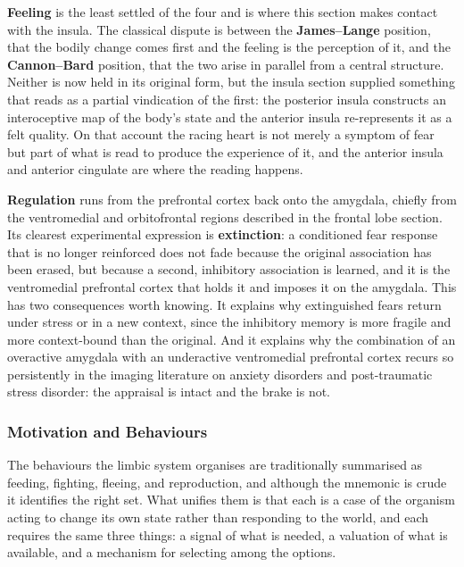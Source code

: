 \documentclass[11pt]{article}
\begin{document}
\textbf{Feeling} is the least settled of the four and is where this section makes contact with the insula. The classical dispute is between the \textbf{James--Lange} position, that the bodily change comes first and the feeling is the perception of it, and the \textbf{Cannon--Bard} position, that the two arise in parallel from a central structure. Neither is now held in its original form, but the insula section supplied something that reads as a partial vindication of the first: the posterior insula constructs an interoceptive map of the body's state and the anterior insula re-represents it as a felt quality. On that account the racing heart is not merely a symptom of fear but part of what is read to produce the experience of it, and the anterior insula and anterior cingulate are where the reading happens.

\textbf{Regulation} runs from the prefrontal cortex back onto the amygdala, chiefly from the ventromedial and orbitofrontal regions described in the frontal lobe section. Its clearest experimental expression is \textbf{extinction}: a conditioned fear response that is no longer reinforced does not fade because the original association has been erased, but because a second, inhibitory association is learned, and it is the ventromedial prefrontal cortex that holds it and imposes it on the amygdala. This has two consequences worth knowing. It explains why extinguished fears return under stress or in a new context, since the inhibitory memory is more fragile and more context-bound than the original. And it explains why the combination of an overactive amygdala with an underactive ventromedial prefrontal cortex recurs so persistently in the imaging literature on anxiety disorders and post-traumatic stress disorder: the appraisal is intact and the brake is not.

\subsubsection{Motivation and Behaviours}

The behaviours the limbic system organises are traditionally summarised as feeding, fighting, fleeing, and reproduction, and although the mnemonic is crude it identifies the right set. What unifies them is that each is a case of the organism acting to change its own state rather than responding to the world, and each requires the same three things: a signal of what is needed, a valuation of what is available, and a mechanism for selecting among the options.
\end{document}
